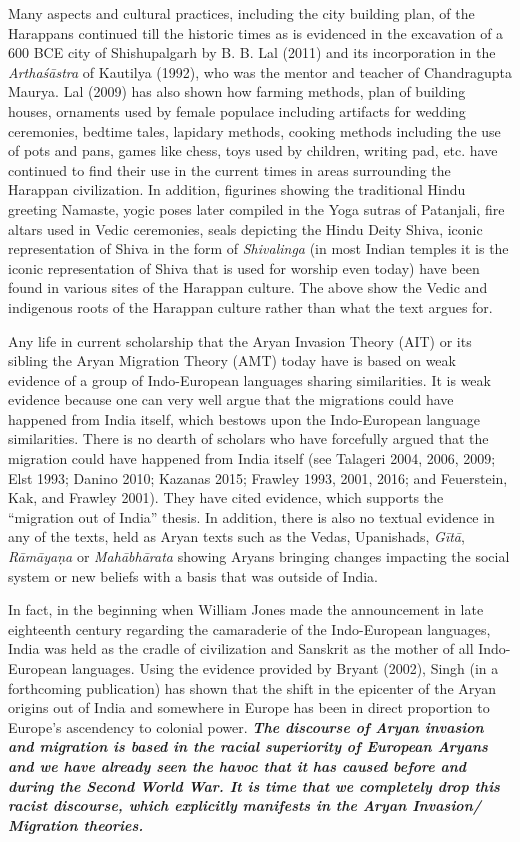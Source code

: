\noindent
Many aspects and cultural practices, including the city building plan, of the Harappans continued till the historic times as is evidenced in the excavation of a 600 BCE city of Shishupalgarh by B. B. Lal (2011) and its incorporation in the \textit{Arthaśāstra} of Kautilya (1992), who was the mentor and teacher of Chandragupta Maurya. Lal (2009) has also shown how farming methods, plan of building houses, ornaments used by female populace including artifacts for wedding ceremonies, bedtime tales, lapidary methods, cooking methods including the use of pots and pans, games like chess, toys used by children, writing pad, etc. have continued to find their use in the current times in areas surrounding the Harappan civilization. In addition, figurines showing the traditional Hindu greeting Namaste, yogic poses later compiled in the Yoga sutras of Patanjali, fire altars used in Vedic ceremonies, seals depicting the Hindu Deity Shiva, iconic representation of Shiva in the form of \textit{Shivalinga} (in most Indian temples it is the iconic representation of Shiva that is used for worship even today) have been found in various sites of the Harappan culture. The above show the Vedic and indigenous roots of the Harappan culture rather than what the text argues for. 

Any life in current scholarship that the Aryan Invasion Theory (AIT) or its sibling the Aryan Migration Theory (AMT) today have is based on weak evidence of a group of Indo-European languages sharing similarities. It is weak evidence because one can very well argue that the migrations could have happened from India itself, which bestows upon the Indo-European language similarities. There is no dearth of scholars who have forcefully argued that the migration could have happened from India itself (see Talageri 2004, 2006, 2009; Elst 1993; Danino 2010; Kazanas 2015; Frawley 1993, 2001, 2016; and Feuerstein, Kak, and Frawley 2001). They have cited evidence, which supports the “migration out of India” thesis. In addition, there is also no textual evidence in any of the texts, held as Aryan texts such as the Vedas, Upanishads, \textit{Gītā}, \textit{Rāmāyaṇa} or \textit{Mahābhārata} showing Aryans bringing changes impacting the social system or new beliefs with a basis that was outside of India.

In fact, in the beginning when William Jones made the announcement in late eighteenth century regarding the camaraderie of the Indo-European languages, India was held as the cradle of civilization and Sanskrit as the mother of all Indo-European languages. Using the evidence provided by Bryant (2002), Singh (in a forthcoming publication) has shown that the shift in the epicenter of the Aryan origins out of India and somewhere in Europe has been in direct proportion to Europe’s ascendency to colonial power. \textit{\textbf{The discourse of Aryan invasion and migration is based in the racial superiority of European Aryans and we have already seen the havoc that it has caused before and during the Second World War. It is time that we completely drop this racist discourse, which explicitly manifests in the Aryan Invasion/ Migration theories.}} 

